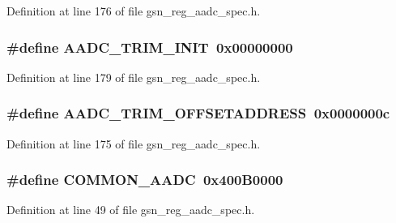 Definition at line 176 of file gsn\_\-reg\_\-aadc\_\-spec.h.

\hypertarget{a00543_a9952c6023c33c6d9fcd72adac33f7e3e}{
\subsubsection[{AADC\_\-TRIM\_\-INIT}]{\setlength{\rightskip}{0pt plus 5cm}\#define AADC\_\-TRIM\_\-INIT~0x00000000}}
\label{a00543_a9952c6023c33c6d9fcd72adac33f7e3e}


Definition at line 179 of file gsn\_\-reg\_\-aadc\_\-spec.h.

\hypertarget{a00543_a45cf079d3af97bf8a8fd3c014f851b87}{
\subsubsection[{AADC\_\-TRIM\_\-OFFSETADDRESS}]{\setlength{\rightskip}{0pt plus 5cm}\#define AADC\_\-TRIM\_\-OFFSETADDRESS~0x0000000c}}
\label{a00543_a45cf079d3af97bf8a8fd3c014f851b87}


Definition at line 175 of file gsn\_\-reg\_\-aadc\_\-spec.h.

\hypertarget{a00543_a1e252a0c2d41bcd61c87fae353d141c6}{
\subsubsection[{COMMON\_\-AADC}]{\setlength{\rightskip}{0pt plus 5cm}\#define COMMON\_\-AADC~0x400B0000}}
\label{a00543_a1e252a0c2d41bcd61c87fae353d141c6}


Definition at line 49 of file gsn\_\-reg\_\-aadc\_\-spec.h.

